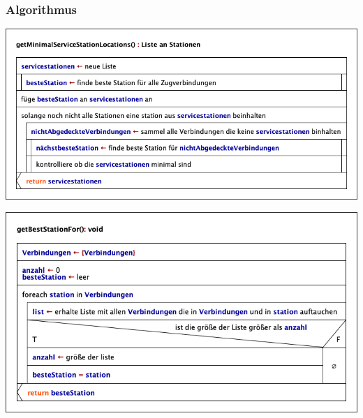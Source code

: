 \subsubsection{Algorithmus}\label{pro:subsubsec:algorithmus}
\begin{center}
    \includegraphics[width=\linewidth]{images/Struktogramme/algorithm/getMinimalServiceStationLocations.png}
    \label{pro:subsubsecpar:berechne-minimale-anzahl-an-servicestationen}
\end{center}

\begin{center}
    \includegraphics[width=\linewidth]{images/Struktogramme/algorithm/getBestStationFor.png}
    \label{pro:subsubsecpar:berechne-minimale-anzahl-an-servicestationen}
\end{center}

